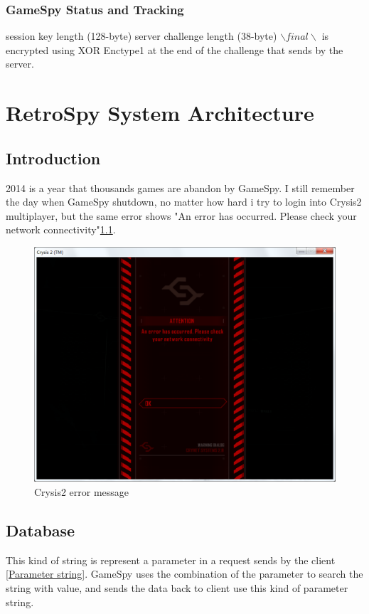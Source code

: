 \documentclass[oneside,titlepage,a4paper]{Definition/retrospy} %
\begin{document}
\section{GameSpy Status and Tracking}

session key length (128-byte)
server challenge length (38-byte)
$ \backslash final \backslash $ is encrypted using XOR Enctype1 at the end of the challenge that sends by the server.

\part{RetroSpy System Architecture}



\chapter{Introduction}
2014 is a year that thousands games are abandon by GameSpy. I still remember the day when GameSpy shutdown, no matter how hard i try to login into Crysis2 multiplayer, but the same error shows "An error has occurred. Please check your network connectivity"\ref{Crysis2 error message}.
\begin{figure}[H]
	\centering
	\caption{Crysis2 error message}
	\label{Crysis2 error message}
	\includegraphics[scale=0.25]{Pictures/Crysis2error.png}
\end{figure}

\chapter{Database}
This kind of string is represent a parameter in a request sends by the client \ref{Parameter string}. GameSpy uses the combination of the parameter to search the string with value, and sends the data back to client use this kind of parameter string.
\end{document}
